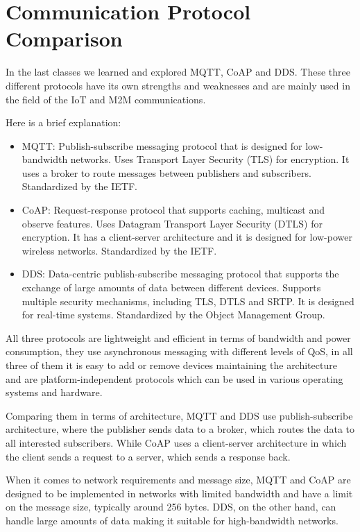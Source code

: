 \section{Communication Protocol Comparison}
\label{sec:report}

In the last classes we learned and explored \ac{MQTT}, \ac{CoAP} and \ac{DDS}.
These three different protocols have its own strengths and weaknesses and are mainly used in the field of the \ac{IoT} and \ac{M2M} communications.

Here is a brief explanation:
\begin{itemize}
    \item \acs{MQTT}: Publish-subscribe messaging protocol that is designed for low-bandwidth networks. 
    Uses Transport Layer Security (TLS) for encryption.
    It uses a broker to route messages between publishers and subscribers. 
    Standardized by the IETF.
    \item \acs{CoAP}: Request-response protocol that supports caching, multicast and observe features. 
    Uses Datagram Transport Layer Security (DTLS) for encryption.
    It has a client-server architecture and it is designed for low-power wireless networks. 
    Standardized by the IETF.
    \item \acs{DDS}: Data-centric publish-subscribe messaging protocol that supports the exchange of large amounts of data between different devices. 
    Supports multiple security mechanisms, including \acs{TLS}, \acs{DTLS} and \acs{SRTP}.
    It is designed for real-time systems.
    Standardized by the Object Management Group.
\end{itemize}

All three protocols are lightweight and efficient in terms of bandwidth and power consumption, they use asynchronous messaging with different levels of \acs{QoS}, in all three of them it is easy to add or remove devices maintaining the architecture and are platform-independent protocols which can be used in various operating systems and hardware.

Comparing them in terms of architecture, \acs{MQTT} and \acs{DDS} use publish-subscribe architecture, where the publisher sends data to a broker, which routes the data to all interested subscribers.
While \acs{CoAP} uses a client-server architecture in which the client sends a request to a server, which sends a response back.

When it comes to network requirements and message size, \acs{MQTT} and \acs{CoAP} are designed to be implemented in networks with limited bandwidth and have a limit on the message size, typically around 256 bytes.
\acs{DDS}, on the other hand, can handle large amounts of data making it suitable for high-bandwidth networks.

